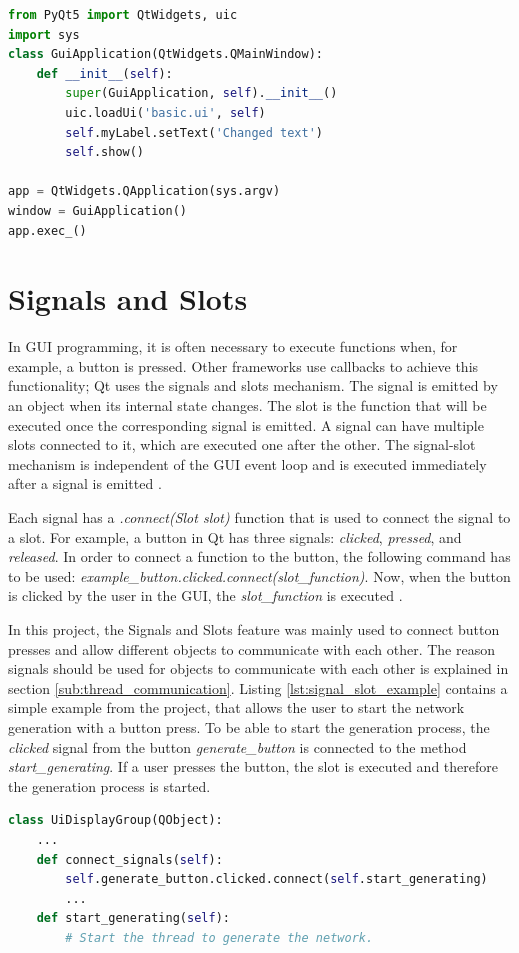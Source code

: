 \begin{lstlisting}[language=python, caption={Simple Qt GUI application}, label={lst:pyqt_gui}]
from PyQt5 import QtWidgets, uic
import sys
class GuiApplication(QtWidgets.QMainWindow):
    def __init__(self):
        super(GuiApplication, self).__init__()
        uic.loadUi('basic.ui', self)
        self.myLabel.setText('Changed text')
        self.show()

app = QtWidgets.QApplication(sys.argv)
window = GuiApplication()
app.exec_()
\end{lstlisting}

\section{Signals and Slots}
\label{sub:signals}

In GUI programming, it is often necessary to execute functions when, for example, a button is pressed. Other frameworks use callbacks to achieve this functionality; Qt uses the signals and slots mechanism. The signal is emitted by an object when its internal state changes. The slot is the function that will be executed once the corresponding signal is emitted. A signal can have multiple slots connected to it, which are executed one after the other. The signal-slot mechanism is independent of the GUI event loop and is executed immediately after a signal is emitted \cite{qt}.

Each signal has a \textit{.connect(Slot slot)} function that is used to connect the signal to a slot. For example, a button in Qt has three signals: \textit{clicked}, \textit{pressed}, and \textit{released}. In order to connect a function to the button, the following command has to be used: \textit{example\_button.clicked.connect(slot\_function)}. Now, when the button is clicked by the user in the GUI, the \textit{slot\_function} is executed \cite{pyqt}.

In this project, the Signals and Slots feature was mainly used to connect button presses and allow different objects to communicate with each other. The reason signals should be used for objects to communicate with each other is explained in section \ref{sub:thread_communication}. Listing \ref{lst:signal_slot_example} contains a simple example from the project, that allows the user to start the network generation with a button press. To be able to start the generation process, the \textit{clicked} signal from the button \textit{generate\_button} is connected to the method \textit{start\_generating}. If a user presses the button, the slot is executed and therefore the generation process is started.
\begin{lstlisting}[language=python, caption={Signals and Slots example from the project.}, label={lst:signal_slot_example}]
class UiDisplayGroup(QObject):
    ...
    def connect_signals(self):
        self.generate_button.clicked.connect(self.start_generating)
        ...
    def start_generating(self):
        # Start the thread to generate the network.
\end{lstlisting}

